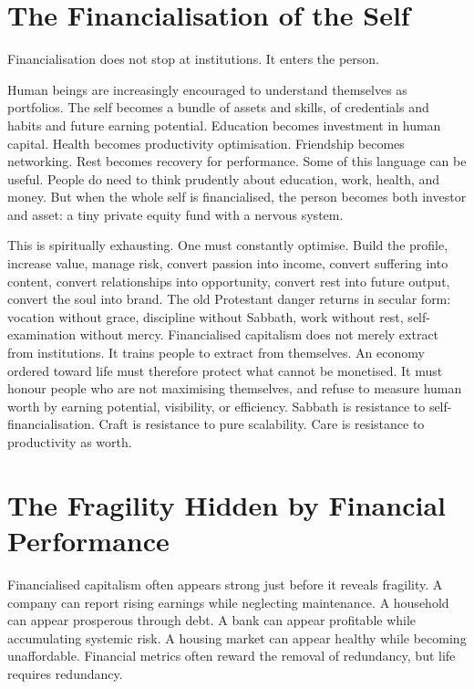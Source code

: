 \documentclass[11pt,a4paper,oneside]{book}
\begin{document}
\section*{The Financialisation of the Self}

Financialisation does not stop at institutions. It enters the person.

Human beings are increasingly encouraged to understand themselves as portfolios. The self becomes a bundle of assets and skills, of credentials and habits and future earning potential. Education becomes investment in human capital. Health becomes productivity optimisation. Friendship becomes networking. Rest becomes recovery for performance. Some of this language can be useful. People do need to think prudently about education, work, health, and money. But when the whole self is financialised, the person becomes both investor and asset: a tiny private equity fund with a nervous system.

This is spiritually exhausting. One must constantly optimise. Build the profile, increase value, manage risk, convert passion into income, convert suffering into content, convert relationships into opportunity, convert rest into future output, convert the soul into brand. The old Protestant danger returns in secular form: vocation without grace, discipline without Sabbath, work without rest, self-examination without mercy. Financialised capitalism does not merely extract from institutions. It trains people to extract from themselves. An economy ordered toward life must therefore protect what cannot be monetised. It must honour people who are not maximising themselves, and refuse to measure human worth by earning potential, visibility, or efficiency. Sabbath is resistance to self-financialisation. Craft is resistance to pure scalability. Care is resistance to productivity as worth.

\section*{The Fragility Hidden by Financial Performance}

Financialised capitalism often appears strong just before it reveals fragility. A company can report rising earnings while neglecting maintenance. A household can appear prosperous through debt. A bank can appear profitable while accumulating systemic risk. A housing market can appear healthy while becoming unaffordable. Financial metrics often reward the removal of redundancy, but life requires redundancy.
\end{document}
